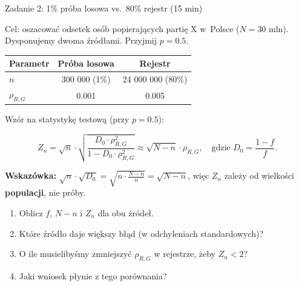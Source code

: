 \documentclass[10pt,ignorenonframetext, aspectratio=169]{beamer}
\begin{document}
\begin{frame}{Zadanie 2: 1\% próba losowa vs.\ 80\% rejestr (15 min)}

Cel: oszacować odsetek osób popierających partię X w~Polsce ($N = 30$ mln). Dysponujemy dwoma źródłami. Przyjmij $p = 0.5$.

\begin{table}
    \centering
    \begin{tabular}{lcc}
    \hline
    Parametr & Próba losowa & Rejestr \\
    \hline
    $n$           & 300 000 (1\%) & 24 000 000 (80\%) \\
    $\rho_{R,G}$  & 0.001         & 0.005 \\
    \hline
    \end{tabular}
\end{table}

Wzór na statystykę testową (przy $p = 0.5$):

\begin{equation*}
    Z_n = \sqrt{n} \cdot \sqrt{\frac{D_0 \cdot \rho_{R,G}^2}{1 - D_0 \cdot \rho_{R,G}^2}} \approx \sqrt{N - n} \cdot \rho_{R,G}, \quad \text{gdzie } D_0 = \frac{1-f}{f}.
\end{equation*}

\textbf{Wskazówka:} $\sqrt{n} \cdot \sqrt{D_0} = \sqrt{n \cdot \frac{N-n}{n}} = \sqrt{N-n}$, więc $Z_n$ zależy od wielkości \textbf{populacji}, nie próby.

\begin{enumerate}
\small
    \item Oblicz $f$, $N - n$ i $Z_n$ dla obu źródeł.
    \item Które źródło daje większy błąd (w odchyleniach standardowych)?
    \item O ile musielibyśmy zmniejszyć $\rho_{R,G}$ w rejestrze, żeby $Z_n < 2$?
    \item Jaki wniosek płynie z tego porównania?
\end{enumerate}

\end{frame}




 
    
\end{document}
